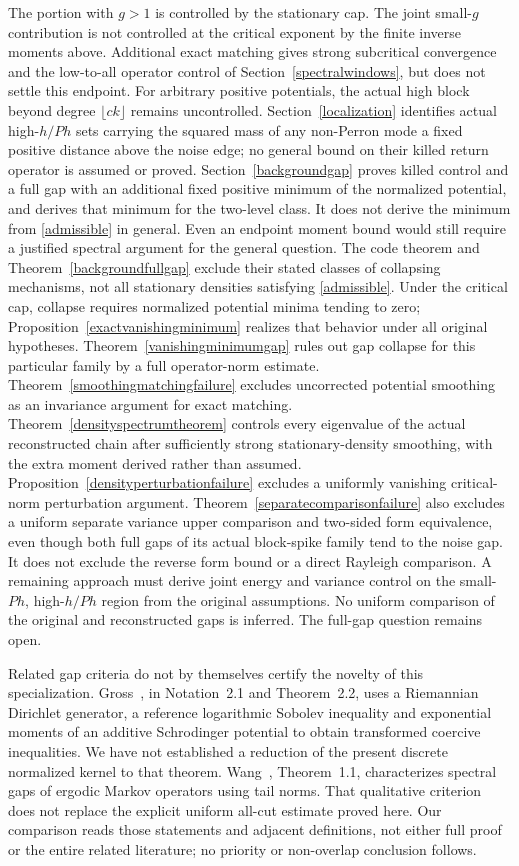 \documentclass[11pt]{article}
\begin{document}
The portion with $g>1$ is controlled by the stationary cap. The joint small-$g$ contribution is not controlled at the critical exponent by the finite inverse moments above. Additional exact matching gives strong subcritical convergence and the low-to-all operator control of Section~\ref{spectralwindows}, but does not settle this endpoint. For arbitrary positive potentials, the actual high block beyond degree $\lfloor ck\rfloor$ remains uncontrolled. Section~\ref{localization} identifies actual high-$h/Ph$ sets carrying the squared mass of any non-Perron mode a fixed positive distance above the noise edge; no general bound on their killed return operator is assumed or proved. Section~\ref{backgroundgap} proves killed control and a full gap with an additional fixed positive minimum of the normalized potential, and derives that minimum for the two-level class. It does not derive the minimum from \eqref{admissible} in general. Even an endpoint moment bound would still require a justified spectral argument for the general question. The code theorem and Theorem~\ref{backgroundfullgap} exclude their stated classes of collapsing mechanisms, not all stationary densities satisfying \eqref{admissible}. Under the critical cap, collapse requires normalized potential minima tending to zero; Proposition~\ref{exactvanishingminimum} realizes that behavior under all original hypotheses. Theorem~\ref{vanishingminimumgap} rules out gap collapse for this particular family by a full operator-norm estimate. Theorem~\ref{smoothingmatchingfailure} excludes uncorrected potential smoothing as an invariance argument for exact matching. Theorem~\ref{densityspectrumtheorem} controls every eigenvalue of the actual reconstructed chain after sufficiently strong stationary-density smoothing, with the extra moment derived rather than assumed. Proposition~\ref{densityperturbationfailure} excludes a uniformly vanishing critical-norm perturbation argument. Theorem~\ref{separatecomparisonfailure} also excludes a uniform separate variance upper comparison and two-sided form equivalence, even though both full gaps of its actual block-spike family tend to the noise gap. It does not exclude the reverse form bound or a direct Rayleigh comparison. A remaining approach must derive joint energy and variance control on the small-$Ph$, high-$h/Ph$ region from the original assumptions. No uniform comparison of the original and reconstructed gaps is inferred. The full-gap question remains open.

Related gap criteria do not by themselves certify the novelty of this
specialization. Gross~\cite{gross2025}, in Notation~2.1 and Theorem~2.2,
uses a Riemannian Dirichlet generator, a reference logarithmic Sobolev
inequality and exponential moments of an additive Schrodinger potential
to obtain transformed coercive inequalities. We have not established a
reduction of the present discrete normalized kernel to that theorem.
Wang~\cite{wang2013}, Theorem~1.1, characterizes spectral gaps of ergodic
Markov operators using tail norms. That qualitative criterion does not
replace the explicit uniform all-cut estimate proved here. Our comparison
reads those statements and adjacent definitions, not either full proof or
the entire related literature; no priority or non-overlap conclusion follows.
\end{document}
